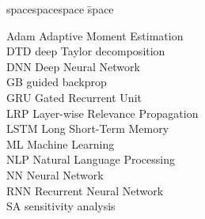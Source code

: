 
\begin{tabbing}
spacespacespace \= space \kill

Adam \> Adaptive Moment Estimation \\
DTD \> deep Taylor decomposition \\
DNN \> Deep Neural Network \\
GB  \> guided backprop \\
GRU \> Gated Recurrent Unit \\
LRP \> Layer-wise Relevance Propagation \\
LSTM \> Long Short-Term Memory \\
ML \> Machine Learning \\
NLP \> Natural Language Processing \\
NN \> Neural Network \\
RNN \> Recurrent Neural Network \\
SA  \> sensitivity analysis \\


\end{tabbing}

